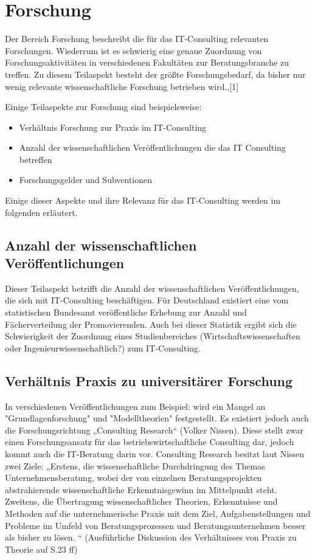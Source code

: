 \section{Forschung}
Der Bereich Forschung beschreibt die für das IT-Consulting relevanten Forschungen. Wiederrum ist es schwierig eine genaue Zuordnung von Forschungsaktivitäten in verschiedenen Fakultäten zur Beratungsbranche zu treffen. Zu diesem Teilaspekt besteht der größte Forschungsbedarf, da bisher nur wenig relevante wissenschaftliche Forschung betrieben wird.\cite[10]{nissen2007consulting},\cite{IDSScheer}[1]

Einige Teilaspekte zur Forschung sind beispielsweise:
\begin{itemize}
\item Verhältnis Forschung zur Praxis im IT-Consulting
\item Anzahl der wissenschaftlichen Veröffentlichungen die das IT Consulting betreffen
\item Forschungsgelder und Subventionen
\end{itemize}

Einige dieser Aspekte und ihre Relevanz für das IT-Consulting werden im folgenden erläutert.

\subsection{Anzahl der wissenschaftlichen Veröffentlichungen}
Dieser Teilaspekt betrifft die Anzahl der wissenschaftlichen Veröffentlichungen, die sich mit IT-Consulting beschäftigen. 
Für Deutschland existiert eine vom statistischen Bundesamt veröffentliche Erhebung zur Anzahl und Fächerverteilung der Promovierenden.\cite{destatis}
Auch bei dieser Statistik ergibt sich die Schwierigkeit der Zuordnung eines Studienbereiches (Wirtschaftswissenschaften oder Ingenieurwissenschaftlich?) zum IT-Consulting. 

\subsection{Verhältnis Praxis zu universitärer Forschung}
In verschiedenen Veröffentlichungen zum Beispiel: \cite[1]{IDSScheer} wird ein Mangel an "Grundlagenforschung" und "Modelltheorien" festgestellt. Es existiert jedoch auch die Forschungsrichtung „Consulting Research“ (Volker Nissen). Diese stellt zwar einen Forschungsansatz für das betriebswirtschaftliche Consulting dar, jedoch kommt auch  die IT-Beratung darin vor. Consulting Research besitzt laut Nissen zwei Ziele: „Erstens, die wissenschaftliche Durchdringung des Themas Unternehmensberatung, wobei der von einzelnen Beratungsprojekten abstrahierende wissenschaftliche Erkenntnisgewinn im Mittelpunkt steht. Zweitens, die Übertragung wissenschaftlicher Theorien, Erkenntnisse und Methoden auf die unternehmerische Praxis mit dem Ziel, Aufgabenstellungen und Probleme im Umfeld von Beratungsprozessen und Beratungsunternehmen besser als bisher zu lösen. “
(Ausführliche Diskussion des Verhältnisses von Praxis zu Theorie auf S.23 ff)

